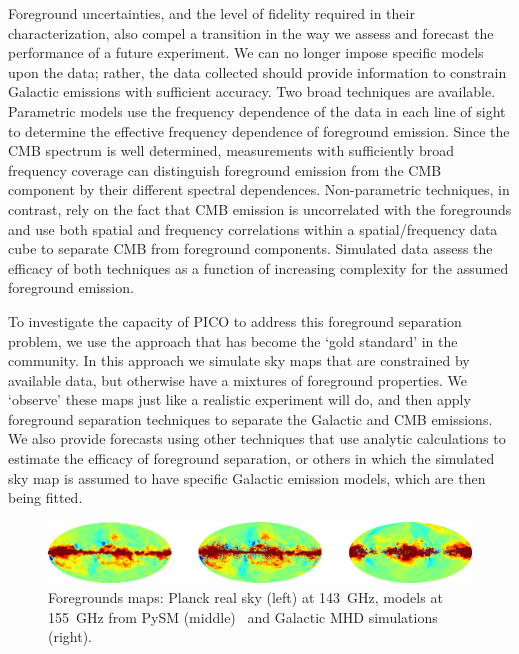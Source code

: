 \documentclass[PICOReport.tex]{subfiles}
\begin{document}

Foreground uncertainties, and the level of fidelity required in their characterization, also compel a transition in the way we assess and forecast the performance of a future experiment. We can no longer impose specific models upon the data; rather, the data collected should provide information to constrain Galactic emissions with sufficient accuracy.  Two broad techniques are available.  Parametric models use the frequency dependence of the data in each line of sight to determine the effective frequency dependence of foreground emission.  Since the CMB spectrum is well determined, measurements with sufficiently broad frequency coverage can distinguish foreground emission from the CMB component by their different spectral dependences.  Non-parametric techniques, in contrast, rely on the fact that CMB emission is uncorrelated with the foregrounds and use both spatial and frequency correlations within a spatial/frequency data cube to separate CMB from foreground components.  Simulated data assess the efficacy of both techniques as a function of increasing complexity for the assumed foreground emission.

To investigate the capacity of PICO to address this foreground separation problem, we use the approach that has become the `gold standard' in the community. In this approach we simulate sky maps that are constrained by available data, but otherwise have a mixtures of foreground properties. We  `observe' these maps just like a realistic experiment will do, and then apply foreground separation techniques to separate the Galactic and CMB emissions. We also provide forecasts using other techniques that use analytic calculations to estimate the efficacy of foreground separation, or others in which the simulated sky map is assumed to have specific Galactic emission models, which are then being fitted. 
\begin{figure}[t]
\begin{center}
\includegraphics[width=.95\textwidth]{images/foregrounds_maps_planck_models}
\vspace{-0.1in}
\caption{Foregrounds maps: Planck real sky (left) at 143~GHz, models at 155~GHz from PySM (middle)~\citep{thorne2018_pysm} and Galactic MHD simulations (right). }
\label{fig:pysm_foregrounds}
\end{center}
\vspace{-0.2in}
\end{figure}
\end{document}
